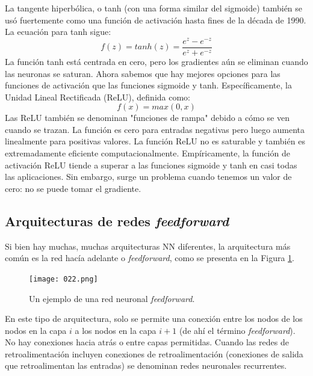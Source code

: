 \documentclass[14.5pt,a4paper]{article}
\begin{document}
La tangente hiperbólica, o tanh (con una forma similar del sigmoide) también se usó fuertemente como una función de activación hasta fines de la década de 1990.
La ecuación para tanh sigue:
\begin{equation}
f(z) = tanh(z) = \frac{e^z - e^{-z}}{e^z + e^{-z}}
\end{equation}
La función tanh está centrada en cero, pero los gradientes aún se eliminan cuando las neuronas se saturan.
Ahora sabemos que hay mejores opciones para las funciones de activación que las funciones sigmoide y tanh. Específicamente, la Unidad Lineal Rectificada (ReLU), definida como:
\begin{equation}
f(x) = max(0, x)
\end{equation}
Las ReLU también se denominan "funciones de rampa" debido a cómo se ven cuando se trazan. La función es cero para entradas negativas pero luego aumenta linealmente para positivas valores. La función ReLU no es saturable y también es extremadamente  eficiente computacionalmente.
Empíricamente, la función de activación ReLU tiende a superar a las funciones sigmoide y tanh en casi todas las aplicaciones. Sin embargo, surge un problema cuando tenemos un valor de cero: no se puede tomar el gradiente.

\subsection{Arquitecturas de redes \textit{feedforward}}

Si bien hay muchas, muchas arquitecturas NN diferentes, la arquitectura más común es la red hacía adelante o \textit{feedforward}, como se presenta en la Figura \ref{fig:nnff}.

\begin{figure}[H]
	\begin{center}				
	\texttt{[image: 022.png]}
  	\caption{Un ejemplo de una red neuronal \textit{feedforward}.}
  	\label{fig:nnff}
  	\end{center}
\end{figure}

En este tipo de arquitectura, solo se permite una conexión entre los nodos de los nodos en la capa $i$ a los nodos en la capa $i + 1$ (de ahí el término \textit{feedforward}). No hay conexiones hacia atrás o entre capas permitidas. Cuando las redes de retroalimentación incluyen conexiones de retroalimentación (conexiones de salida que retroalimentan las entradas) se denominan redes neuronales recurrentes.
\end{document}
